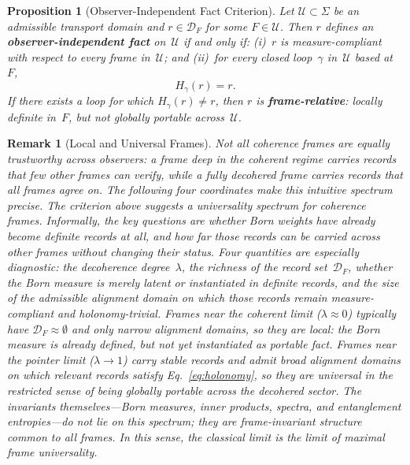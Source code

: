 \documentclass[aps,prd,twocolumn,superscriptaddress,nofootinbib,floatfix]{revtex4-2}
\newtheorem{proposition}{Proposition}
\newtheorem{remark}{Remark}
\newcommand{\Sig}{\Sigma}
\begin{document}
\begin{proposition}[Observer-Independent Fact Criterion]\label{prop:observer-independent-fact}
Let $\mathcal{U} \subset \Sig$ be an admissible transport domain and $r \in \mathcal{D}_F$ for some $F \in \mathcal{U}$. Then $r$ defines an \textbf{observer-independent fact} on~$\mathcal{U}$ if and only if: (i)~$r$ is measure-compliant with respect to every frame in~$\mathcal{U}$; and (ii)~for every closed loop~$\gamma$ in~$\mathcal{U}$ based at~$F$,
\begin{equation}\label{eq:holonomy}
H_\gamma(r) = r.
\end{equation}
If there exists a loop for which $H_\gamma(r) \neq r$, then $r$ is \textbf{frame-relative}: locally definite in~$F$, but not globally portable across~$\mathcal{U}$.
\end{proposition}
\begin{remark}[Local and Universal Frames]
Not all coherence frames are equally trustworthy across observers: a frame deep in the coherent regime carries records that few other frames can verify, while a fully decohered frame carries records that all frames agree on. The following four coordinates make this intuitive spectrum precise.
The criterion above suggests a \emph{universality spectrum} for coherence frames. Informally, the key questions are whether Born weights have already become definite records at all, and how far those records can be carried across other frames without changing their status. Four quantities are especially diagnostic: the decoherence degree~$\lambda$, the richness of the record set~$\mathcal{D}_F$, whether the Born measure is merely latent or instantiated in definite records, and the size of the admissible alignment domain on which those records remain measure-compliant and holonomy-trivial. Frames near the coherent limit ($\lambda \approx 0$) typically have $\mathcal{D}_F \approx \emptyset$ and only narrow alignment domains, so they are \emph{local}: the Born measure is already defined, but not yet instantiated as portable fact. Frames near the pointer limit ($\lambda \to 1$) carry stable records and admit broad alignment domains on which relevant records satisfy Eq.~\eqref{eq:holonomy}, so they are \emph{universal} in the restricted sense of being globally portable across the decohered sector. The invariants themselves---Born measures, inner products, spectra, and entanglement entropies---do not lie on this spectrum; they are frame-invariant structure common to all frames. In this sense, the classical limit is the limit of maximal frame universality.
\end{remark}
\end{document}
